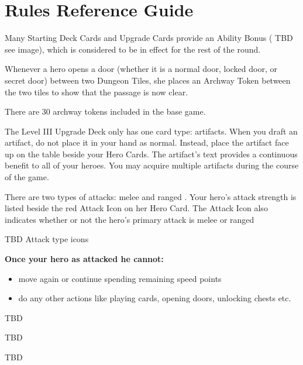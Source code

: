 \section{Rules Reference Guide}
\label{sec:RulesReferenceGuide}

Many Starting Deck Cards and Upgrade Cards provide an Ability Bonus ( TBD see image), which is considered to be in effect for the rest of the round.

Whenever a hero opens a door (whether it is a normal door, locked door, or secret door) between two Dungeon Tiles, she places an Archway Token between the two tiles to show that the passage is now clear.

There are 30 archway tokens included in the base game.


The Level III Upgrade Deck only has one card type: artifacts. When you draft an artifact, do not place it in your hand as normal. Instead, place the artifact face up on the table beside your Hero Cards. The artifact’s text provides a continuous benefit to all of your heroes. You may acquire multiple artifacts during the course of the game.


There are two types of attacks: melee and ranged . Your hero’s attack strength is listed beside the red Attack Icon on her Hero Card. The Attack Icon also indicates whether or not the hero’s primary attack is melee or ranged

TBD Attack type icons

\textbf{Once your hero as attacked he cannot:}
\begin{itemize}
  \item move again or continue spending remaining speed points
  \item do any other actions like playing cards, opening doors, unlocking chests etc.
\end{itemize}



TBD

TBD

TBD

